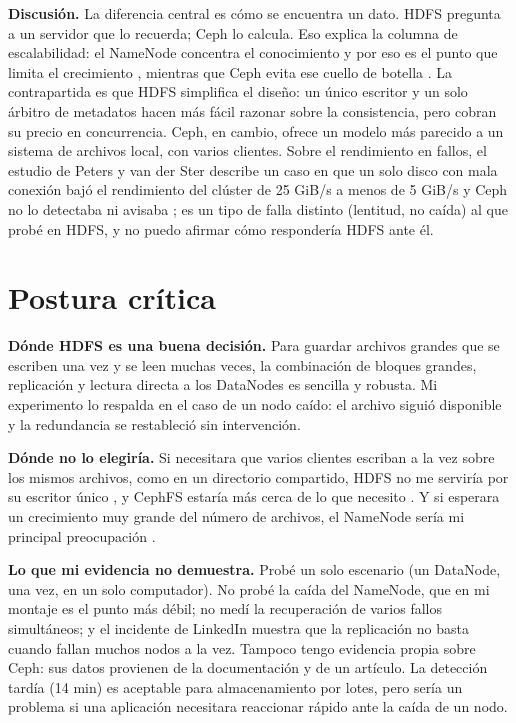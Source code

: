 \documentclass[11pt,a4paper]{article}
\begin{document}
\textbf{Discusión.} La diferencia central es cómo se encuentra un dato. HDFS pregunta a un servidor que lo recuerda; Ceph lo calcula. Eso explica la columna de escalabilidad: el NameNode concentra el conocimiento y por eso es el punto que limita el crecimiento \cite{Dhulavvagol2023}, mientras que Ceph evita ese cuello de botella \cite{CephArchitecture}. La contrapartida es que HDFS simplifica el diseño: un único escritor y un solo árbitro de metadatos hacen más fácil razonar sobre la consistencia, pero cobran su precio en concurrencia. Ceph, en cambio, ofrece un modelo más parecido a un sistema de archivos local, con varios clientes. Sobre el rendimiento en fallos, el estudio de Peters y van der Ster describe un caso en que un solo disco con mala conexión bajó el rendimiento del clúster de 25 GiB/s a menos de 5 GiB/s y Ceph no lo detectaba ni avisaba \cite{Peters2021}; es un tipo de falla distinto (lentitud, no caída) al que probé en HDFS, y no puedo afirmar cómo respondería HDFS ante él.

\section{Postura crítica}
\textbf{Dónde HDFS es una buena decisión.} Para guardar archivos grandes que se escriben una vez y se leen muchas veces, la combinación de bloques grandes, replicación y lectura directa a los DataNodes es sencilla y robusta. Mi experimento lo respalda en el caso de un nodo caído: el archivo siguió disponible y la redundancia se restableció sin intervención.

\textbf{Dónde no lo elegiría.} Si necesitara que varios clientes escriban a la vez sobre los mismos archivos, como en un directorio compartido, HDFS no me serviría por su escritor único \cite{HadoopHDFSDesign}, y CephFS estaría más cerca de lo que necesito \cite{Peters2021}. Y si esperara un crecimiento muy grande del número de archivos, el NameNode sería mi principal preocupación \cite{Dhulavvagol2023}.

\textbf{Lo que mi evidencia no demuestra.} Probé un solo escenario (un DataNode, una vez, en un solo computador). No probé la caída del NameNode, que en mi montaje es el punto más débil; no medí la recuperación de varios fallos simultáneos; y el incidente de LinkedIn \cite{LinkedIn2020} muestra que la replicación no basta cuando fallan muchos nodos a la vez. Tampoco tengo evidencia propia sobre Ceph: sus datos provienen de la documentación y de un artículo. La detección tardía (14 min) es aceptable para almacenamiento por lotes, pero sería un problema si una aplicación necesitara reaccionar rápido ante la caída de un nodo.
\end{document}
